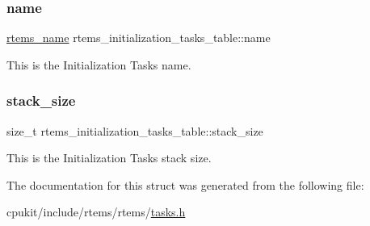 \subsubsection{\texorpdfstring{name}{name}}
{\footnotesize\ttfamily \mbox{\hyperlink{group__ClassicTasks_ga55fb63c49f68c0cbd9bee004da15b1fd}{rtems\+\_\+name}} rtems\+\_\+initialization\+\_\+tasks\+\_\+table\+::name}

This is the Initialization Task\textquotesingle{}s name. \mbox{\label{structrtems__initialization__tasks__table_ae2d552be04e90d74dc1d46105cc23b6d}} 
\subsubsection{\texorpdfstring{stack\_size}{stack\_size}}
{\footnotesize\ttfamily size\+\_\+t rtems\+\_\+initialization\+\_\+tasks\+\_\+table\+::stack\+\_\+size}

This is the Initialization Task\textquotesingle{}s stack size. 

The documentation for this struct was generated from the following file\+:\begin{DoxyCompactItemize}
\item 
cpukit/include/rtems/rtems/\mbox{\hyperlink{tasks_8h}{tasks.\+h}}\end{DoxyCompactItemize}
